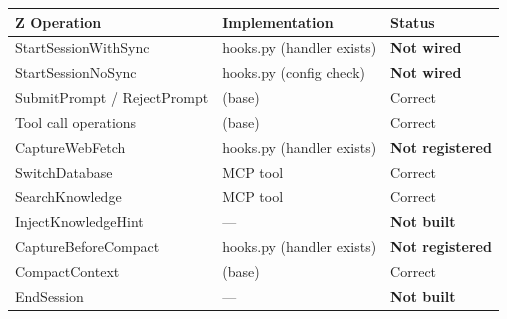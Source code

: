 \documentclass[a4paper,10pt,fleqn]{article}
\begin{document}
\begin{tabular}{lll}
\hline
\textbf{Z Operation} & \textbf{Implementation} & \textbf{Status} \\
\hline
StartSessionWithSync & hooks.py (handler exists) & \textbf{Not wired} \\
StartSessionNoSync & hooks.py (config check) & \textbf{Not wired} \\
SubmitPrompt / RejectPrompt & (base) & Correct \\
Tool call operations & (base) & Correct \\
CaptureWebFetch & hooks.py (handler exists) & \textbf{Not registered} \\
SwitchDatabase & MCP tool & Correct \\
SearchKnowledge & MCP tool & Correct \\
InjectKnowledgeHint & --- & \textbf{Not built} \\
CaptureBeforeCompact & hooks.py (handler exists) & \textbf{Not registered} \\
CompactContext & (base) & Correct \\
EndSession & --- & \textbf{Not built} \\
\hline
\end{tabular}
\end{document}

